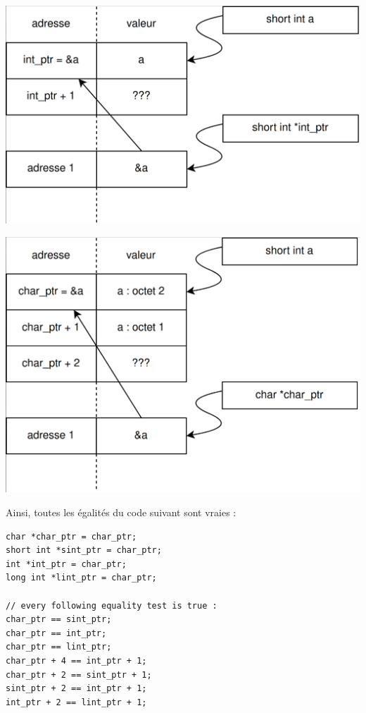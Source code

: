 \documentclass[../../../main.tex]{subfiles}
\begin{document}
\begin{minipage}{0.5\textwidth}
\begin{center}
		\includegraphics[width=\textwidth]{pointeur2}
	\end{center}
\end{minipage}
\begin{minipage}{0.5\textwidth}
\begin{center}
		\includegraphics[width=\textwidth]{pointeur3}
	\end{center}
\end{minipage}
 
Ainsi, toutes les égalités du code suivant sont vraies :
\begin{verbatim}
char *char_ptr = char_ptr;
short int *sint_ptr = char_ptr;
int *int_ptr = char_ptr;
long int *lint_ptr = char_ptr;

// every following equality test is true :
char_ptr == sint_ptr;
char_ptr == int_ptr;
char_ptr == lint_ptr;
char_ptr + 4 ==	int_ptr + 1;
char_ptr + 2 == sint_ptr + 1;
sint_ptr + 2 == int_ptr + 1;
int_ptr + 2 == lint_ptr + 1;
\end{verbatim}
\end{document}

